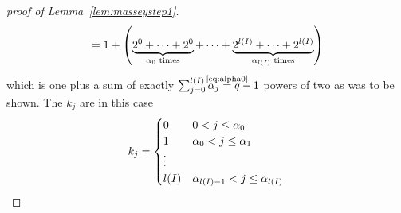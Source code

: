 \begin{proof}[proof of Lemma~\ref{lem:masseystep1}]
\begin{align*}
    = 1 + \left(
      \underbrace{2^0 +\dotsb+ 2^0}_{\text{$\alpha_0$ times}}
      + \dotsb
      + \underbrace{2^{l(I)}+\dotsb+2^{l(I)}}_{\text{$\alpha_{l(I)}$ times}}
      \right)
  \end{align*}
  which is one plus a sum of exactly
  $\sum_{j=0}^{\l(I)}\alpha_j\cequalsby{\eqref{eq:alpha0}} q-1$
  powers of two as was to be shown.
  The $k_j$ are in this case
  \begin{gather*}
    k_j = \begin{cases}
      0 & 0< j\leq \alpha_0\\
      1 & \alpha_0< j\leq \alpha_1\\
      \vdots\\
      l(I) & \alpha_{l(I)-1}<j\leq \alpha_{l(I)}
    \end{cases}
    \qedhere
  \end{gather*}
\end{proof}

